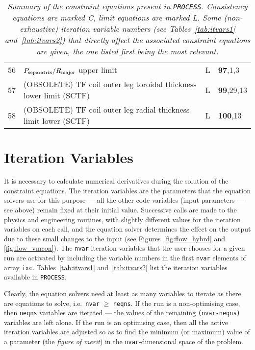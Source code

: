 \documentclass[11pt,a4paper]{report}
\newcommand{\process}{\mbox{\texttt{PROCESS}}}
\begin{document}
\begin{table}[tbph]
\begin{center}
\begin{tabular}{||c|l|c|l||}
56  & $P_{\mbox{\scriptsize separatrix}}/R_{\mbox{\scriptsize major}}$ upper limit & L    & \textbf{97},1,3 \\
57  & (OBSOLETE) TF coil outer leg toroidal thickness lower limit (SCTF)   & L    & \textbf{99},29,13  \\
58  & (OBSOLETE) TF coil outer leg radial thickness limit lower (SCTF)     & L    & \textbf{100},13 \\
\hline
\end{tabular}
\end{center}
\caption[List of constraint equations]
{\label{tab:eqns}
  \textit{Summary of the constraint equations present in \process. Consistency
    equations are marked C, limit equations are marked L\@. Some
    (non-exhaustive) iteration variable numbers (see Tables~\ref{tab:itvars1}
    and~\ref{tab:itvars2}) that directly affect the associated constraint
    equations are given, the one listed first being the most relevant.}
}
\normalsize
\end{table}

\section{Iteration Variables}
\label{sec:itvars}

It is necessary to calculate numerical derivatives during the solution of the
constraint equations. The iteration variables are the parameters that the
equation solvers use for this purpose --- all the other code variables (input
parameters --- see above) remain fixed at their initial value. Successive
calls are made to the physics and engineering routines, with slightly
different values for the iteration variables on each call, and the equation
solver determines the effect on the output due to these small changes to the
input (see Figures~\ref{fig:flow_hybrd} and \ref{fig:flow_vmcon}). The
\texttt{nvar} iteration variables that the user chooses for a given run are
activated by including the variable numbers in the first \texttt{nvar}
elements of array \texttt{ixc}. Tables~\ref{tab:itvars1} and~\ref{tab:itvars2}
list the iteration variables available in \process.

Clearly, the equation solvers need at least as many variables to iterate as
there are equations to solve, i.e.\ \texttt{nvar} $\geq$ \texttt{neqns}. If
the run is a non-optimising case, then \texttt{neqns} variables are iterated
--- the values of the remaining \texttt{(nvar-neqns)} variables are left
alone. If the run is an optimising case, then all the active iteration
variables are adjusted so as to find the minimum (or maximum) value of a
parameter (the \textit{ figure of merit}) in the \texttt{nvar}-dimensional
space of the problem.
\end{document}
